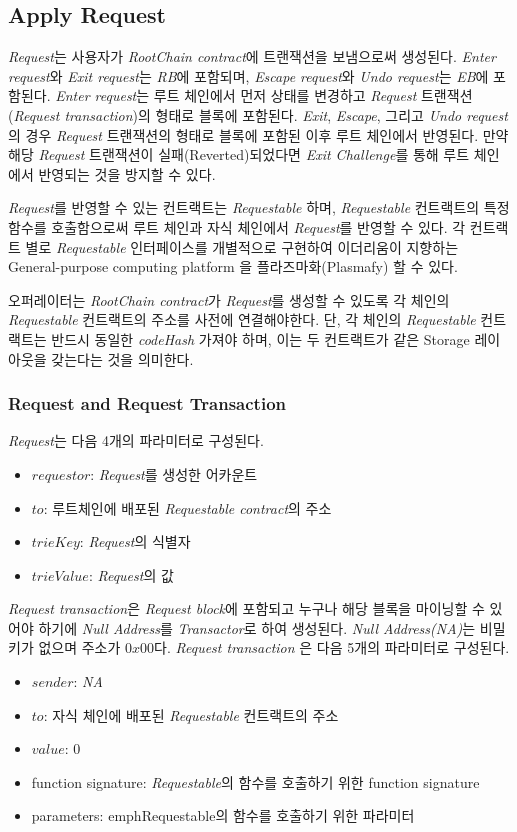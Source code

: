 \documentclass[letterpaper, 11pt]{article}
\begin{document}
\subsection{Apply Request}
\begin{CJK}{UTF8}{mj}
\emph{Request}는 사용자가 \emph{RootChain contract}에 트랜잭션을 보냄으로써 생성된다. \emph{Enter request}와 \emph{Exit request}는 \emph{RB}에 포함되며, \emph{Escape request}와 \emph{Undo request}는 \emph{EB}에 포함된다. \emph{Enter request}는 루트 체인에서 먼저 상태를 변경하고 \emph{Request} 트랜잭션(\emph{Request transaction})의 형태로 블록에 포함된다. \emph{Exit}, \emph{Escape}, 그리고 \emph{Undo request}의 경우 \emph{Request} 트랜잭션의 형태로 블록에 포함된 이후 루트 체인에서 반영된다. 만약 해당 \emph{Request} 트랜잭션이 실패(Reverted)되었다면 \emph{Exit Challenge}를 통해 루트 체인에서 반영되는 것을 방지할 수 있다.

\emph{Request}를 반영할 수 있는 컨트랙트는 \emph{Requestable} 하며, \emph{Requestable} 컨트랙트의 특정 함수를 호출함으로써 루트 체인과 자식 체인에서 \emph{Request}를 반영할 수 있다. 각 컨트랙트 별로 \emph{Requestable} 인터페이스를 개별적으로 구현하여 이더리움이 지향하는 General-purpose computing platform 을 플라즈마화(Plasmafy) 할 수 있다.

오퍼레이터는 \emph{RootChain contract}가 \emph{Request}를 생성할 수 있도록 각 체인의 \emph{Requestable} 컨트랙트의 주소를 사전에 연결해야한다. 단, 각 체인의 \emph{Requestable} 컨트랙트는 반드시 동일한 \emph{codeHash} 가져야 하며, 이는 두 컨트랙트가 같은 Storage 레이아웃을 갖는다는 것을 의미한다.

\subsubsection{Request and Request Transaction}
\begin{CJK}{UTF8}{mj}
\emph{Request}는 다음 4개의 파라미터로 구성된다.
\begin{itemize}
\item $requestor$: \emph{Request}를 생성한 어카운트
\item $to$: 루트체인에 배포된 \emph{Requestable contract}의 주소
\item $trieKey$: \emph{Request}의 식별자
\item $trieValue$: \emph{Request}의 값
\end{itemize}

\emph{Request transaction}은 \emph{Request block}에 포함되고 누구나 해당 블록을 마이닝할 수 있어야 하기에 \emph{Null Address}를 \emph{Transactor}로 하여 생성된다. \emph{Null Address(NA)}는 비밀키가 없으며 주소가 $0x00$다.
\emph{Request transaction} 은 다음 5개의 파라미터로 구성된다.
\begin{itemize}
\item $sender$: \emph{NA}
\item $to$: 자식 체인에 배포된 \emph{Requestable} 컨트랙트의 주소
\item $value$: 0
\item function signature: \emph{Requestable}의 함수를 호출하기 위한 function signature
\item parameters: emph{Requestable}의 함수를 호출하기 위한 파라미터
\end{itemize}


\end{CJK}
\end{CJK}
\end{document}
